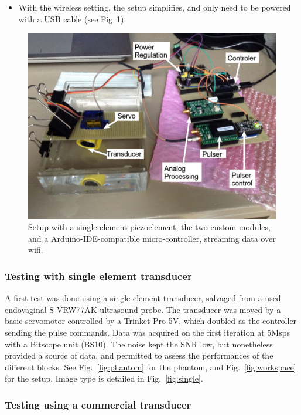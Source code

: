 \documentclass[letterpaper, 10 pt, conference]{ieeeconf} %
\begin{document}
\begin{itemize}
\item With the wireless setting, the setup simplifies, and only need to be powered with a USB cable (see Fig~\ref{fig:wireless}).
\end{itemize}

\begin{figure}%
\centering
\includegraphics[width=.95\linewidth]{kit-overaview}
\caption{Setup with a single element piezoelement, the two custom modules, and a Arduino-IDE-compatible micro-controller, streaming data over wifi.}
\label{fig:wireless}
\end{figure}


\subsubsection{Testing with single element transducer}

A first test was done using a single-element transducer, salvaged from a used endovaginal S-VRW77AK ultrasound probe. The transducer was moved by a basic servomotor controlled by a Trinket Pro 5V, which doubled as the controller sending the pulse commands. Data was acquired on the first iteration at 5Msps with a Bitscope unit (BS10). The noise kept the SNR low, but nonetheless provided a source of data, and permitted to assess the performances of the different blocks. See Fig.~\ref{fig:phantom} for the phantom, and Fig.~\ref{fig:workspace} for the setup. Image type is detailed in Fig.~\ref{fig:single}.

\subsubsection{Testing using a commercial transducer}
\end{document}
